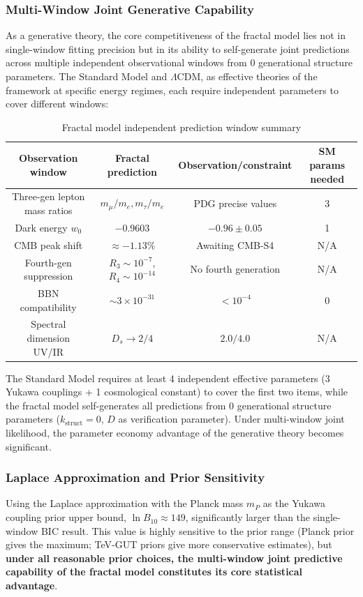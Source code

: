 \documentclass[12pt,a4paper,twocolumn]{article}
\begin{document}
\subsubsection{Multi-Window Joint Generative Capability}
As a generative theory, the core competitiveness of the fractal model lies not in single-window fitting precision but in its ability to self-generate joint predictions across multiple independent observational windows from 0 generational structure parameters. The Standard Model and $\Lambda$CDM, as effective theories of the framework at specific energy regimes, each require independent parameters to cover different windows:

\begin{table}[H]
\centering
\footnotesize
\caption{Fractal model independent prediction window summary}
\begin{tabular}{c|c|c|c}
\hline
\textbf{Observation window} & \textbf{Fractal prediction} & \textbf{Observation/constraint} & \textbf{SM params needed} \\
\hline
Three-gen lepton mass ratios & $m_\mu/m_e, m_\tau/m_e$ & PDG precise values & 3 \\
Dark energy $w_0$ & $-0.9603$ & $-0.96\pm0.05$ & 1 \\
CMB peak shift & $\approx -1.13\%$ & Awaiting CMB-S4 & N/A \\
Fourth-gen suppression & $R_3\sim10^{-7}$, $R_4\sim10^{-14}$ & No fourth generation & N/A \\
BBN compatibility & $\sim\!3\times 10^{-31}$ & $<10^{-4}$ & 0 \\
Spectral dimension UV/IR & $D_s\to2/4$ & $2.0/4.0$ & N/A \\
\hline
\end{tabular}
\end{table}

The Standard Model requires at least 4 independent effective parameters (3 Yukawa couplings + 1 cosmological constant) to cover the first two items, while the fractal model self-generates all predictions from 0 generational structure parameters ($k_{\text{struct}}=0$, $D$ as verification parameter). Under multi-window joint likelihood, the parameter economy advantage of the generative theory becomes significant.

\subsubsection{Laplace Approximation and Prior Sensitivity}
Using the Laplace approximation with the Planck mass $m_P$ as the Yukawa coupling prior upper bound, $\ln B_{10}\approx149$, significantly larger than the single-window BIC result. This value is highly sensitive to the prior range (Planck prior gives the maximum; TeV-GUT priors give more conservative estimates), but \textbf{under all reasonable prior choices, the multi-window joint predictive capability of the fractal model constitutes its core statistical advantage}.
\end{document}
